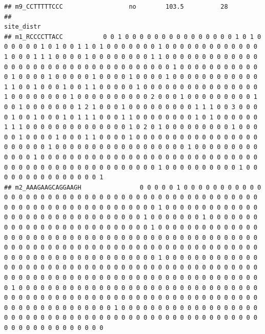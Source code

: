 \documentclass[
]{book}
\begin{document}
\begin{verbatim}
## m9_CCTTTTTCCC                  no        103.5          28
##                                                                                                                                                                                                                                                                                                                                                                                                                                                                                                                                                                                                                                                                                                                                                                                                                                                                                                                                                                                                                                    site_distr
## m1_RCCCCTTACC           0 0 1 0 0 0 0 0 0 0 0 0 0 0 0 0 0 0 1 0 1 0 0 0 0 0 0 1 0 1 0 0 1 1 0 1 0 0 0 0 0 0 0 1 0 0 0 0 0 0 0 0 0 0 0 0 0 1 0 0 0 1 1 1 0 0 0 0 1 0 0 0 0 0 0 0 0 1 1 0 0 0 0 0 0 0 0 0 0 0 0 0 0 0 0 0 0 0 0 0 0 0 0 0 0 0 0 0 0 0 0 0 0 0 0 1 0 0 0 0 0 0 0 0 0 0 0 0 1 0 0 0 0 1 0 0 0 0 0 1 0 0 0 0 1 0 0 0 0 1 0 0 0 0 0 0 0 0 0 0 0 0 1 1 0 0 1 0 0 0 1 0 0 1 1 0 0 0 0 0 1 0 0 0 0 0 0 0 0 0 0 0 0 0 0 0 0 1 0 0 0 0 0 0 0 0 1 0 0 0 0 0 0 0 0 0 0 2 0 0 0 1 0 0 0 0 0 0 0 0 0 1 0 0 1 0 0 0 0 0 0 0 1 2 1 0 0 0 1 0 0 0 0 0 0 0 0 0 1 1 1 0 0 3 0 0 0 0 1 0 0 1 0 0 0 1 0 1 1 1 0 0 0 1 1 0 0 0 0 0 0 0 0 1 0 1 0 0 0 0 0 0 1 1 1 0 0 0 0 0 0 0 0 0 0 0 0 0 0 1 0 2 0 1 0 0 0 0 0 0 0 0 0 1 0 0 0 0 0 1 0 0 0 0 1 0 0 0 1 1 0 0 0 0 1 0 0 0 0 0 0 0 0 0 0 0 0 0 0 0 0 0 0 0 0 0 0 0 1 0 0 0 0 0 0 0 0 0 0 0 0 0 0 0 0 0 0 1 0 0 0 0 0 0 0 0 0 0 0 0 0 1 0 0 0 0 0 0 0 0 0 0 0 0 0 0 0 0 0 0 0 0 0 0 0 0 0 0 0 0 0 0 0 0 0 0 0 0 0 0 0 0 0 0 0 0 0 0 0 0 0 0 0 1 0 0 0 0 0 0 0 0 0 0 1 0 0 0 0 0 0 0 0 0 0 0 0 0 0 0 1
## m2_AAAGAAGCAGGAAGH                0 0 0 0 0 1 0 0 0 0 0 0 0 0 0 0 0 0 0 0 0 0 0 0 0 0 0 0 0 0 0 0 0 0 0 0 0 0 0 0 0 0 0 0 0 0 0 0 0 0 0 0 0 0 0 0 0 0 0 0 0 0 0 0 0 0 0 0 0 0 0 0 0 1 0 0 0 0 0 0 0 0 0 0 0 0 0 0 0 0 0 0 0 0 0 0 0 0 0 0 0 0 0 0 0 0 1 0 0 0 0 0 0 0 1 0 0 0 0 0 0 0 0 0 0 0 0 0 0 0 0 0 0 0 0 0 0 0 0 0 0 0 1 0 0 0 0 0 0 0 0 0 0 0 0 0 0 0 0 0 0 0 0 0 0 0 0 0 0 0 0 0 0 0 0 0 0 0 0 0 0 0 0 0 0 0 0 0 0 0 0 0 0 0 0 0 0 0 0 0 0 0 0 0 0 0 0 0 0 0 0 0 0 0 0 0 0 0 0 0 0 0 0 0 0 0 0 0 0 0 0 0 0 0 0 0 0 0 0 0 0 0 0 0 0 0 0 0 1 0 0 0 0 0 0 0 0 0 0 0 0 0 0 0 0 0 0 0 0 0 0 0 0 0 0 0 0 0 0 0 0 0 0 0 0 0 0 0 0 0 0 0 0 0 0 0 0 0 0 0 0 0 0 0 0 0 0 0 0 0 0 0 0 0 0 0 0 0 0 0 0 0 0 0 0 0 0 0 0 0 0 0 0 1 0 0 0 0 0 0 0 0 0 0 0 0 0 0 0 0 0 0 0 0 0 0 0 0 0 0 0 0 0 0 0 0 0 0 0 0 0 0 0 0 0 0 0 0 0 0 0 0 0 0 0 0 0 0 0 0 0 0 0 0 0 0 0 0 0 0 0 0 0 0 0 0 0 0 0 0 0 0 0 0 0 0 0 1 0 0 0 0 0 0 0 0 0 0 0 0 0 0 0 0 0 0 0 0 0 0 0 0 0 0 0 0 0 0 0 0 0 0 0 0 0 0 0 0 0 0 0 0 0 0 0 0 0 0 0 0 0 0 0 0 0 0 0 0 0 0 0 0 0 0 0 0

\end{verbatim}
\end{document}

